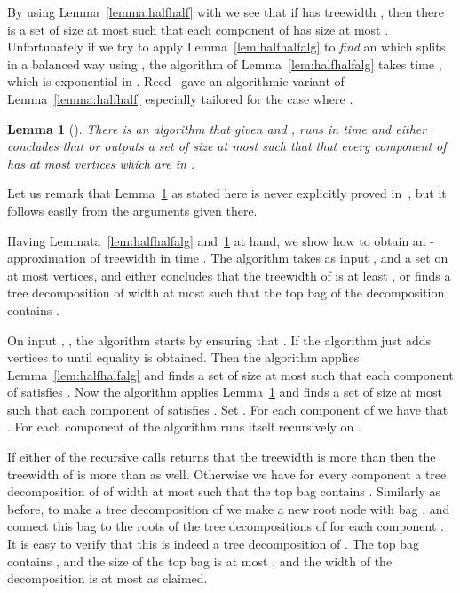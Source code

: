 \documentclass[a4paper,11pt]{article}
\newtheorem{lemma}{Lemma}[section]
\theoremstyle{definition}
\theoremstyle{remark}
\begin{document}
By using Lemma~\ref{lemma:halfhalf} with  we see that if 
has treewidth , then there is a set  of size at most 
such that each component of  has size at most
.  Unfortunately if we try to apply
Lemma~\ref{lem:halfhalfalg} to {\em find} an  which splits  in a
balanced way using , the algorithm of
Lemma~\ref{lem:halfhalfalg} takes time , which is exponential in .  Reed~\cite{Reed92} gave
an algorithmic variant of Lemma~\ref{lemma:halfhalf} especially
tailored for the case where .

\begin{lemma}[\cite{Reed92}]
  \label{lem:reedBalSep} There is an algorithm that given  and ,
  runs in time  and either concludes that  or
  outputs a set  of size at most  such that that every
  component of  has at most  vertices
  which are in .
\end{lemma}
Let us remark that Lemma~\ref{lem:reedBalSep} as stated here is never
explicitly proved in~\cite{Reed92}, but it follows easily from the
arguments given there.

Having Lemmata~\ref{lem:halfhalfalg} and~\ref{lem:reedBalSep} at hand,
we show how to obtain an -approximation of treewidth in time
.  The algorithm takes as input ,  and a set
 on at most  vertices, and either concludes that the
treewidth of  is at least , or finds a tree decomposition of
width at most  such that the top bag of the decomposition
contains .

On input , ,  the algorithm starts by ensuring that
.  If  the algorithm just adds vertices to 
until equality is obtained.  Then the algorithm applies
Lemma~\ref{lem:halfhalfalg} and finds a set  of size at most
 such that each component  of  satisfies
.  Now the algorithm
applies Lemma~\ref{lem:reedBalSep} and finds a set  of size at
most  such that each component  of 
satisfies .  Set .  For each component  of  we have
that .  For each component  of
 the algorithm runs itself recursively on .

If either of the recursive calls returns that the treewidth is more
than  then the treewidth of  is more than  as well.
Otherwise we have for every component  a tree decomposition of
 of width at most  such that the top bag contains
.  Similarly as before, to make a tree
decomposition of  we make a new root node with bag , and
connect this bag to the roots of the tree decompositions of  for each component .  It is easy to verify that this is
indeed a tree decomposition of .  The top bag contains , and the
size of the top bag is at most , and the width of the decomposition is at
most  as claimed.
\end{document}

